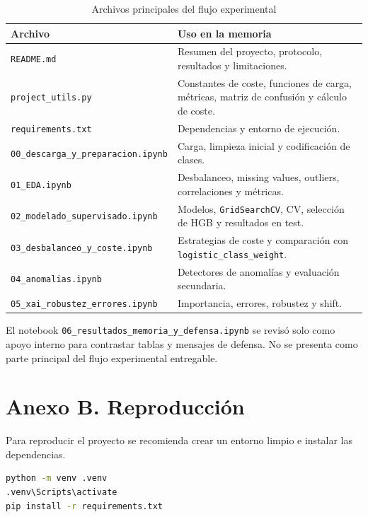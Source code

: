 \documentclass[11pt,a4paper]{article}
\begin{document}
\begin{table}[H]
\centering
\caption{Archivos principales del flujo experimental}
\small
\begin{tabular}{@{}p{}p{}@{}}
\toprule
\textbf{Archivo} & \textbf{Uso en la memoria}\\
\midrule
\texttt{README.md} & Resumen del proyecto, protocolo, resultados y limitaciones.\\
\texttt{project\_utils.py} & Constantes de coste, funciones de carga, métricas, matriz de confusión y cálculo de coste.\\
\texttt{requirements.txt} & Dependencias y entorno de ejecución.\\
\texttt{00\_descarga\_y\_preparacion.ipynb} & Carga, limpieza inicial y codificación de clases.\\
\texttt{01\_EDA.ipynb} & Desbalanceo, missing values, outliers, correlaciones y métricas.\\
\texttt{02\_modelado\_supervisado.ipynb} & Modelos, \texttt{GridSearchCV}, CV, selección de HGB y resultados en test.\\
\texttt{03\_desbalanceo\_y\_coste.ipynb} & Estrategias de coste y comparación con \texttt{logistic\_class\_weight}.\\
\texttt{04\_anomalias.ipynb} & Detectores de anomalías y evaluación secundaria.\\
\texttt{05\_xai\_robustez\_errores.ipynb} & Importancia, errores, robustez y shift.\\
\bottomrule
\end{tabular}
\end{table}

El notebook \texttt{06\_resultados\_memoria\_y\_defensa.ipynb} se revisó solo como apoyo interno para contrastar tablas y mensajes de defensa. No se presenta como parte principal del flujo experimental entregable.

\section{Anexo B. Reproducción}
\label{anexo_reproduccion}

Para reproducir el proyecto se recomienda crear un entorno limpio e instalar las dependencias.

\begin{lstlisting}[language=bash]
python -m venv .venv
.venv\Scripts\activate
pip install -r requirements.txt
\end{lstlisting}
\end{document}
